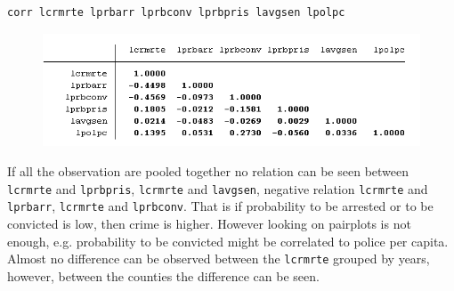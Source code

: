 \documentclass[12pt,a4paper, oneside]{extreport}
\begin{document}
\begin{figure}[htb]
\begin{minipage}[H]{0.33\linewidth}
	\end{minipage}
	\begin{minipage}[H]{0.33\linewidth}
	\end{minipage}	
\end{figure}

\newpage

\begin{verbatim}
corr lcrmrte lprbarr lprbconv lprbpris lavgsen lpolpc
\end{verbatim}

\begin{figure}[H]
	\centering
	\includegraphics[width=0.7\linewidth]{screenshot001}
	\label{fig:screenshot001}
\end{figure}


If all the observation are pooled together no relation can be seen between \texttt{lcrmrte} and \texttt{lprbpris}, \texttt{lcrmrte} and \texttt{lavgsen}, negative relation \texttt{lcrmrte} and \texttt{lprbarr}, \texttt{lcrmrte} and \texttt{lprbconv}. That is if probability to be arrested or to be convicted is low, then crime is higher. However looking on pairplots is not enough, e.g. probability to be convicted might be correlated to police per capita.
Almost no difference can be observed between the \texttt{lcrmrte} grouped by years, however, between the counties the difference can be seen. 
\end{document}

